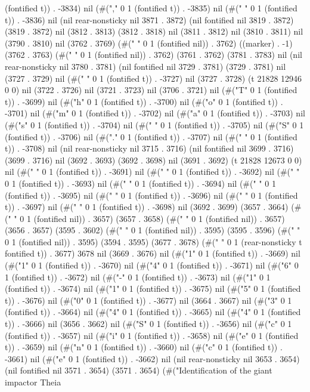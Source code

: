 (fontified t)) . -3834) nil (#("," 0 1 (fontified t)) . -3835) nil (#("	" 0 1 (fontified t)) . -3836) nil (nil rear-nonsticky nil 3871 . 3872) (nil fontified nil 3819 . 3872) (3819 . 3872) nil (3812 . 3813) (3812 . 3818) nil (3811 . 3812) nil (3810 . 3811) nil (3790 . 3810) nil (3762 . 3769) (#(" " 0 1 (fontified nil)) . 3762) ((marker) . -1) (3762 . 3763) (#(" " 0 1 (fontified nil)) . 3762) (3761 . 3762) (3781 . 3783) nil (nil rear-nonsticky nil 3780 . 3781) (nil fontified nil 3729 . 3781) (3729 . 3781) nil (3727 . 3729) nil (#(" " 0 1 (fontified t)) . -3727) nil (3727 . 3728) (t 21828 12946 0 0) nil (3722 . 3726) nil (3721 . 3723) nil (3706 . 3721) nil (#("T" 0 1 (fontified t)) . -3699) nil (#("h" 0 1 (fontified t)) . -3700) nil (#("o" 0 1 (fontified t)) . -3701) nil (#("m" 0 1 (fontified t)) . -3702) nil (#("a" 0 1 (fontified t)) . -3703) nil (#("s" 0 1 (fontified t)) . -3704) nil (#(" " 0 1 (fontified t)) . -3705) nil (#("S" 0 1 (fontified t)) . -3706) nil (#("." 0 1 (fontified t)) . -3707) nil (#(" " 0 1 (fontified t)) . -3708) nil (nil rear-nonsticky nil 3715 . 3716) (nil fontified nil 3699 . 3716) (3699 . 3716) nil (3692 . 3693) (3692 . 3698) nil (3691 . 3692) (t 21828 12673 0 0) nil (#("
" 0 1 (fontified t)) . -3691) nil (#(" " 0 1 (fontified t)) . -3692) nil (#(" " 0 1 (fontified t)) . -3693) nil (#(" " 0 1 (fontified t)) . -3694) nil (#(" " 0 1 (fontified t)) . -3695) nil (#(" " 0 1 (fontified t)) . -3696) nil (#(" " 0 1 (fontified t)) . -3697) nil (#(" " 0 1 (fontified t)) . -3698) nil (3692 . 3699) (3657 . 3664) (#(" " 0 1 (fontified nil)) . 3657) (3657 . 3658) (#(" " 0 1 (fontified nil)) . 3657) (3656 . 3657) (3595 . 3602) (#(" " 0 1 (fontified nil)) . 3595) (3595 . 3596) (#(" " 0 1 (fontified nil)) . 3595) (3594 . 3595) (3677 . 3678) (#(" " 0 1 (rear-nonsticky t fontified t)) . 3677) 3678 nil (3669 . 3676) nil (#("1" 0 1 (fontified t)) . -3669) nil (#("1" 0 1 (fontified t)) . -3670) nil (#("4" 0 1 (fontified t)) . -3671) nil (#("6" 0 1 (fontified t)) . -3672) nil (#("-" 0 1 (fontified t)) . -3673) nil (#("1" 0 1 (fontified t)) . -3674) nil (#("1" 0 1 (fontified t)) . -3675) nil (#("5" 0 1 (fontified t)) . -3676) nil (#("0" 0 1 (fontified t)) . -3677) nil (3664 . 3667) nil (#("3" 0 1 (fontified t)) . -3664) nil (#("4" 0 1 (fontified t)) . -3665) nil (#("4" 0 1 (fontified t)) . -3666) nil (3656 . 3662) nil (#("S" 0 1 (fontified t)) . -3656) nil (#("c" 0 1 (fontified t)) . -3657) nil (#("i" 0 1 (fontified t)) . -3658) nil (#("e" 0 1 (fontified t)) . -3659) nil (#("n" 0 1 (fontified t)) . -3660) nil (#("c" 0 1 (fontified t)) . -3661) nil (#("e" 0 1 (fontified t)) . -3662) nil (nil rear-nonsticky nil 3653 . 3654) (nil fontified nil 3571 . 3654) (3571 . 3654) (#("Identification of the giant impactor Theia
